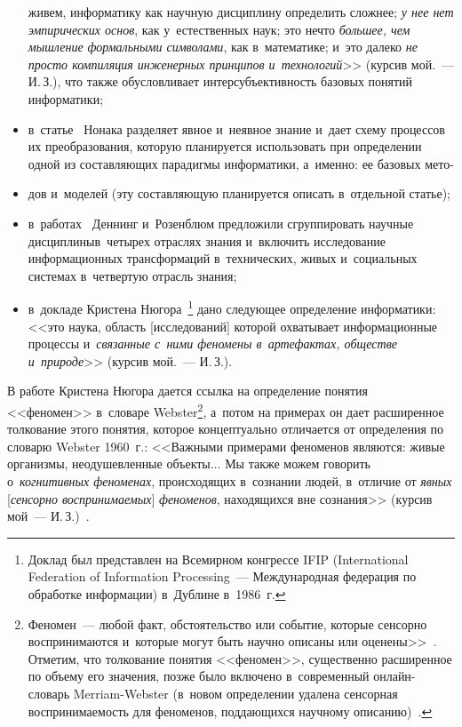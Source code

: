 \begin{multicols}{2}
\begin{itemize}
живем, информатику как научную дисциплину определить сложнее; \textit{у 
нее нет эмпирических основ}, как у~естественных наук; это нечто 
\textit{большее, чем мышление формальными символами}, как в~математике; 
и~это далеко \textit{не просто компиляция инженерных принципов 
и~технологий}>> (курсив мой.~--- И.\,З.), что также обуслов\-ли\-ва\-ет 
интерсубъективность базовых понятий информатики;
  \item в~статье~\cite{23-zac} Нонака разделяет явное и~неявное знание и~дает 
схему процессов их преобразования, которую планируется использовать при 
определении одной из со\-став\-ля\-ющих парадигмы информатики, а~именно: ее 
базовых мето-\linebreak\vspace*{-12pt}
\end{itemize}

\columnbreak

\noindent
\begin{itemize}
\item[\,]
дов и~моделей (эту составляющую планируется описать в~отдельной статье);
  \item в~работах~\cite{24-zac, 25-zac} Деннинг и~Розенблюм предложили 
сгруппировать научные дисциплины\linebreak в~четырех отраслях знания и~включить 
исследование информационных трансформаций в~технических, живых 
и~социальных системах в~чет\-вер\-тую отрасль знания;
  \item в~докладе Кристена Нюгора~\cite{26-zac}\footnote[4]{Доклад был представлен 
на Всемирном конгрессе IFIP (International Federation of Information Processing~--- Международная 
федерация по обработке информации) в~Дублине в~1986~г.} дано следующее определение 
информатики: <<это наука, область [исследований] которой охватывает 
информационные процессы и~\textit{связанные с~ними феномены 
в~артефактах, обществе и~природе}>> (курсив мой.~--- И.\,З.).
  \end{itemize}
  
  В работе Кристена Нюгора дается ссылка на определение понятия 
<<феномен>> в~словаре Webster\footnote[5]{Феномен~--- любой факт, обстоятельство или 
событие, которые сенсорно воспринимаются и~которые могут быть научно описаны или 
оценены>>~\cite{27-zac}. Отметим, что толкование понятия <<феномен>>, существенно 
расширенное по объему его значения, позже было включено в~современный он\-лайн-сло\-варь 
Merriam-Webster (в~новом определении удалена сенсорная воспринимаемость для феноменов, 
поддающихся научному описанию)~\cite{28-zac}.}, а~потом на примерах он дает 
расширенное толкование этого понятия, которое концептуально отличается от 
определения по словарю Webster 1960~г.: <<Важными примерами 
феноменов являются: живые организмы, неодушевленные объекты$\ldots$ Мы 
также можем говорить о~\textit{когнитивных феноменах}, происходящих 
в~сознании людей, в~отличие от \textit{явных} [\textit{сенсорно 
воспринимаемых}] \textit{феноменов}, находящихся вне сознания>> (курсив 
 мой~--- И.\,З.)~\cite{26-zac}.
  

\end{multicols}
